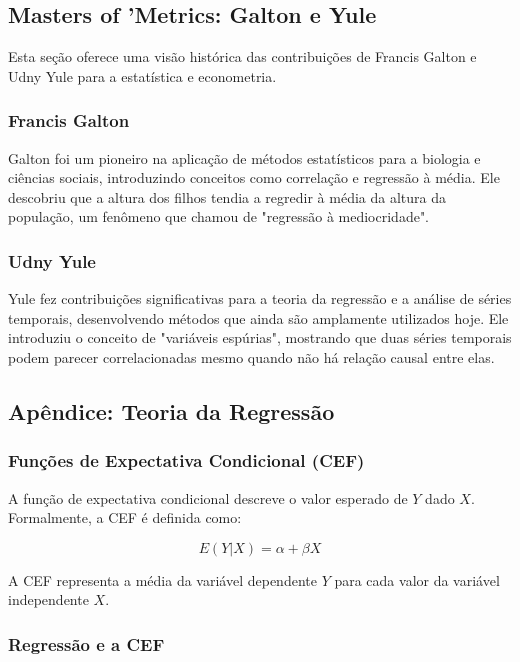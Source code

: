 \documentclass[a4paper,12pt]{article}[abntex2]
\begin{document}
\subsection*{Masters of 'Metrics: Galton e Yule}

Esta seção oferece uma visão histórica das contribuições de Francis Galton e Udny Yule para a estatística e econometria.

\subsubsection*{Francis Galton}

Galton foi um pioneiro na aplicação de métodos estatísticos para a biologia e ciências sociais, introduzindo conceitos como correlação e regressão à média. Ele descobriu que a altura dos filhos tendia a regredir à média da altura da população, um fenômeno que chamou de "regressão à mediocridade".

\subsubsection*{Udny Yule}

Yule fez contribuições significativas para a teoria da regressão e a análise de séries temporais, desenvolvendo métodos que ainda são amplamente utilizados hoje. Ele introduziu o conceito de "variáveis espúrias", mostrando que duas séries temporais podem parecer correlacionadas mesmo quando não há relação causal entre elas.

\subsection*{Apêndice: Teoria da Regressão}

\subsubsection*{Funções de Expectativa Condicional (CEF)}

A função de expectativa condicional descreve o valor esperado de \(Y\) dado \(X\). Formalmente, a CEF é definida como:

\begin{equation}
    E(Y|X) = \alpha + \beta X
\end{equation}

A CEF representa a média da variável dependente \(Y\) para cada valor da variável independente \(X\).

\subsubsection*{Regressão e a CEF}
\end{document}
